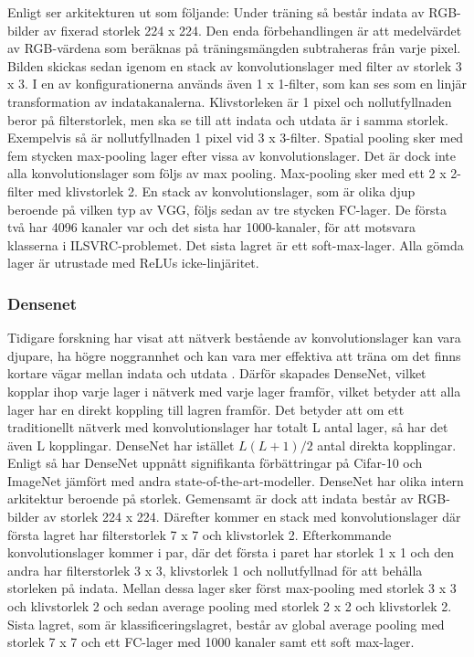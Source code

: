 \documentclass[]{kththesis}
\begin{document}
Enligt \cite{simonyan2014very} ser arkitekturen ut som följande: Under träning så består indata av RGB-bilder av fixerad storlek 224 x 224. Den enda förbehandlingen är att medelvärdet av RGB-värdena som beräknas på träningsmängden subtraheras från varje pixel. Bilden skickas sedan igenom en stack av konvolutionslager med filter av storlek 3 x 3. I en av konfigurationerna används även 1 x 1-filter, som kan ses som en linjär transformation av indatakanalerna. Klivstorleken är 1 pixel och nollutfyllnaden beror på filterstorlek, men ska se till att indata och utdata är i samma storlek. Exempelvis så är nollutfyllnaden 1 pixel vid 3 x 3-filter. Spatial pooling sker med fem stycken max-pooling lager efter vissa av konvolutionslager. Det är dock inte alla konvolutionslager som följs av max pooling. Max-pooling sker med ett 2 x 2-filter med klivstorlek 2. En stack av konvolutionslager, som är olika djup beroende på vilken typ av VGG, följs sedan av tre stycken FC-lager. De första två har 4096 kanaler var och det sista har 1000-kanaler, för att motsvara klasserna i ILSVRC-problemet. Det sista lagret är ett soft-max-lager. Alla gömda lager är utrustade med ReLUs icke-linjäritet. 

\subsubsection{Densenet}
Tidigare forskning har visat att nätverk bestående av konvolutionslager kan vara djupare, ha högre noggrannhet och kan vara mer effektiva att träna om det finns kortare vägar mellan indata och utdata \parencite{huang2017densely}. Därför skapades DenseNet, vilket kopplar ihop varje lager i nätverk med varje lager framför, vilket betyder att alla lager har en direkt koppling till lagren framför. Det betyder att om ett traditionellt nätverk med konvolutionslager har totalt L antal lager, så har det även L kopplingar. DenseNet har istället \begin{math} L(L+1)/2 \end{math} antal direkta kopplingar. Enligt \cite{huang2017densely} så har DenseNet uppnått signifikanta förbättringar på Cifar-10 och ImageNet jämfört med andra state-of-the-art-modeller. DenseNet har olika intern arkitektur beroende på storlek. Gemensamt är dock att indata består av RGB-bilder av storlek 224 x 224. Därefter kommer en stack med konvolutionslager där första lagret har filterstorlek 7 x 7 och klivstorlek 2. Efterkommande konvolutionslager kommer i par, där det första i paret har storlek 1 x 1 och den andra har filterstorlek 3 x 3, klivstorlek 1 och nollutfyllnad för att behålla storleken på indata. Mellan dessa lager sker först max-pooling med storlek 3 x 3 och klivstorlek 2 och sedan average pooling med storlek 2 x 2 och klivstorlek 2. Sista lagret, som är klassificeringslagret, består av global average pooling med storlek 7 x 7 och ett FC-lager med 1000 kanaler samt ett soft max-lager.
\end{document}
